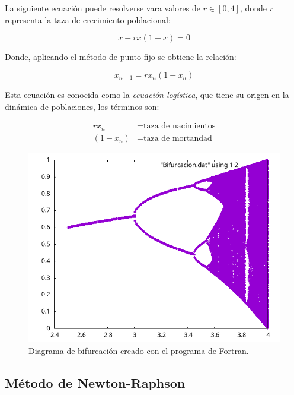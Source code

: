\begin{ex}
	La siguiente ecuación puede resolverse vara valores de $r \in [0,4]$,
	donde $r$ representa la taza de crecimiento poblacional:

	\[
		x - rx(1 - x) = 0
	\]

	Donde, aplicando el método de punto fijo se obtiene la relación:

	\[
		x_{n+1} = r x_n (1 - x_n)
	\]

    Esta ecuación es conocida como la \emph{ecuación logística}, que tiene su
    origen en la dinámica de poblaciones, los términos son:

	\begin{align*}
		rx_n &= \text{taza de nacimientos} \\
		(1 - x_n) &= \text{taza de mortandad}
	\end{align*}

	

	\begin{figure}
		\centering
		\includegraphics[width=1.0\textwidth]{programas/bifurcacion/bifurcacion.png}
		\caption{Diagrama de bifurcación creado con el programa de
		Fortran.}
	\end{figure}
\end{ex}

\subsection{Método de Newton-Raphson}

